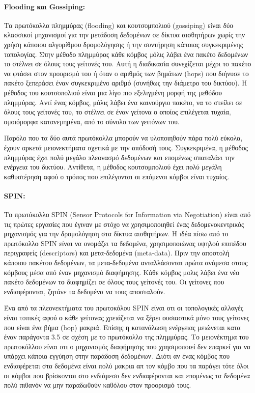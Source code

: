 \paragraph{Flooding και Gossiping:} Τα πρωτόκολλα πλημμύρας (flooding) και κουτσομπολιού (gossiping) \cite{gossiping} είναι δύο κλασσικοί μηχανισμοί για την μετάδοση
δεδομένων σε δίκτυα αισθητήρων χωρίς την χρήση κάποιου αλγορίθμου δρομολόγησης ή την συντήρηση κάποιας συγκεκριμένης τοπολογίας.
Στην μέθοδο πλημμύρας κάθε κόμβος μόλις λάβει ένα πακέτο δεδομένων το στέλνει σε όλους τους γείτονές του. Αυτή η διαδικασία συνεχίζεται μέχρι το πακέτο να φτάσει
στον προορισμό του ή όταν ο αριθμός των βημάτων (hops) που διήνυσε το πακέτο ξεπεράσει έναν συγκεκριμένο αριθμό (συνήθως την διάμετρο του δικτύου). Η μέθοδος του
κουτσοπολιού είναι μια λίγο πιο εξελιγμένη μορφή της μεθόδου πλημμύρας. Αντί ένας κόμβος, μόλις λάβει ένα καινούργιο πακέτο, να το στείλει σε όλους τους γείτονές του,
το στέλνει σε έναν γείτονα ο οποίος επιλέγεται τυχαία, ομοιόμορφα κατανεμημένα, από το σύνολο των γειτόνων του.

Παρόλο που τα δύο αυτά πρωτόκολλα μπορούν να υλοποιηθούν πάρα πολύ εύκολα, έχουν αρκετά μειονεκτήματα σχετικά με την απόδοσή τους. Συγκεκριμένα, η μέθοδος
πλημμύρας έχει πολύ μεγάλο πλεονασμό δεδομένων και επομένως σπαταλάει την ενέργεια του δικτύου. Αντίθετα, η μέθοδος κουτσομπολιού έχει πολύ μεγάλη καθυστέρηση αφού ο
τρόπος που επιλέγονται οι επόμενοι κόμβοι είναι τυχαίος.

\paragraph{SPIN:} Το πρωτόκολλο SPIN (Sensor Protocols for Information via Negotiation) \cite{spin_protocol} είναι από τις πρώτες εργασίες που έγιναν με στόχο να
χρησιμοποιηθεί ένας δεδομενοκεντρικός μηχανισμός για την δρομολόγηση στα δίκτυα αισθητήρων. Η ιδέα πίσω από το πρωτόκολλο SPIN είναι να ονομάζει τα δεδομένα,
χρησιμοποιώνας υψηλού επιπέδου περιγραφείς (descriptors) και μετα-δεδομένα (meta-data). Πριν την αποστολή κάποιου πακέτου δεδομένων, τα μετα-δεδομένα ανταλλάσονται
πρώτα ανάμεσα στους κόμβους μέσα από έναν μηχανισμό διαφήμησης. Κάθε κόμβος μολις λάβει ένα νέο πακέτο δεδομένων το διαφημίζει σε όλους τους γείτονές του. Οι γείτονες
που ενδιαφέρονται, ζητάνε τα δεδομένα να τους αποσταλούν.

Ένα από τα πλεονεκτήματα του πρωτοκόλου SPIN είναι οτι οι τοπολογικές αλλαγές είναι τοπικές αφού ο κάθε γείτονας χρειάζεται να ξέρει ουσιαστικά μόνο τους γείτονες
που είναι ένα βήμα (hop) μακριά. Επίσης η κατανάλωση ενέργειας μειώνεται κατα έναν παράγοντα 3.5 \cite{spin_protocol} σε σχέση με το πρωτόκολλο της πλημμύρας. Το
μειονέκτημα του πρωτοκόλλου είναι οτι ο μηχανισμός διαφήμησης που χρησιμοποιεί δεν επαρκεί για να υπάρχει κάποια εγγύηση στην παράδοση δεδομένων. Διότι αν ένας κόμβος
που ενδιαφέρεται στα δεδομένα είναι πολύ μακρια απ τον κόμβο που τα παράγει τότε όλοι οι κόμβοι που βρίσκονται στο ενδιάμεσο δεν ενδιαφέρονται και επομένως τα
δεδομένα πολύ πιθανόν να μην παραδωθούν καθόλου στον προορισμό τους.


